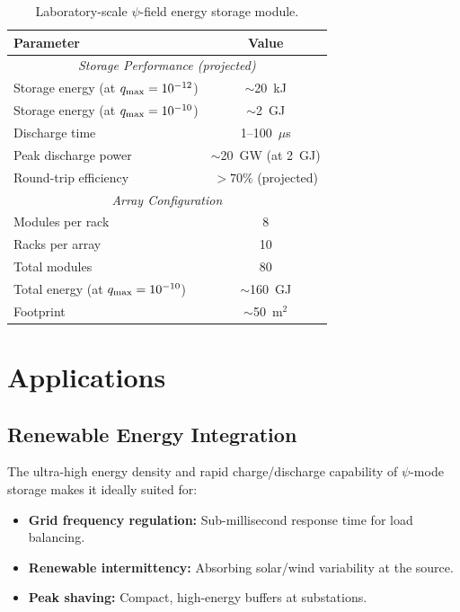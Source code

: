 \documentclass[aps,prd,twocolumn,showpacs,preprintnumbers,superscriptaddress,nofootinbib]{revtex4-2}
\begin{document}
\begin{table}[h]
\caption{Laboratory-scale $\psi$-field energy storage module.}
\label{tab:lab-module}
\begin{ruledtabular}
\begin{tabular}{lc}
Parameter & Value \\
\hline
\multicolumn{2}{c}{\textit{Storage Performance (projected)}} \\
Storage energy (at $q_{\rm max}=10^{-12}$) & $\sim$20~kJ \\
Storage energy (at $q_{\rm max}=10^{-10}$) & $\sim$2~GJ \\
Discharge time & 1--100~$\mu$s \\
Peak discharge power & $\sim$20~GW (at 2~GJ) \\
Round-trip efficiency & $> 70\%$ (projected) \\
\hline
\multicolumn{2}{c}{\textit{Array Configuration}} \\
Modules per rack & 8 \\
Racks per array & 10 \\
Total modules & 80 \\
Total energy (at $q_{\rm max}=10^{-10}$) & $\sim$160~GJ \\
Footprint & $\sim$50~m$^2$ \\
\end{tabular}
\end{ruledtabular}
\end{table}

\section{Applications}\label{sec:applications}

\subsection{Renewable Energy Integration}\label{sec:renewable}

The ultra-high energy density and rapid charge/discharge capability of
$\psi$-mode storage makes it ideally suited for:
\begin{itemize}
\item \textbf{Grid frequency regulation:} Sub-millisecond response time
for load balancing.
\item \textbf{Renewable intermittency:} Absorbing solar/wind variability
at the source.
\item \textbf{Peak shaving:} Compact, high-energy buffers at substations.
\end{itemize}
\end{document}

